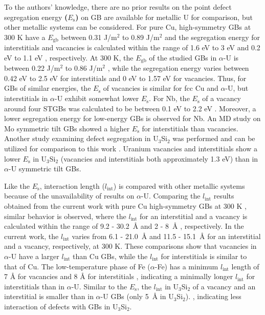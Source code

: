 \documentclass[review]{elsarticle}
\providecommand{\DIFaddtex}[1]{{\bf #1}} %
\providecommand{\DIFaddbegin}{\protect\color{blue}} %
\providecommand{\DIFaddend}{\protect\color{black}} %
\providecommand{\DIFadd}[1]{\texorpdfstring{\DIFaddtex{#1}}{#1}} %
\newcommand{\DIFaddincludegraphics}[2][]{{\color{blue}\fbox{\DIFOincludegraphics[#1]{#2}}}} %
\DeclareRobustCommand{\DIFaddbegin}{\DIFOaddbegin \let\includegraphics\DIFaddincludegraphics} %
\DeclareRobustCommand{\DIFaddend}{\DIFOaddend \let\includegraphics\DIFOincludegraphics} %
\begin{document}
\DIFaddend To the authors' knowledge, there are no prior results on the point defect segregation energy \DIFaddbegin \DIFadd{($E_{\mathrm{s}}$) }\DIFaddend on GB are available for metallic U for comparison, but other metallic systems can be considered. For pure Cu, high-symmetry GBs at 300 K \cite{bai_cu_inter, bai_cu_gb_with_interstitial_inter} have a  $E_{\mathrm{gb}}$  between 0.31 J/m${^2}$ to 0.89 J/m${^2}$ and the segregation energy for interstitials and vacancies is calculated within the range of 1.6 eV to 3 eV and 0.2 eV to 1.1 eV \cite{bai_cu_inter}, respectively. At 300 K, the  $E_{\mathrm{gb}}$  of the studied GBs in $\alpha$-U is between 0.22 J/m${^2}$ to 0.86 J/m${^2}$ \cite{MAHBUBA2021153072}, while the segregation energy varies between 0.42 eV to 2.5 eV for interstitials and 0 eV to 1.57 eV for vacancies. Thus, for GBs of similar energies, the $E_{\mathrm{s}}$ of vacancies is similar for fcc Cu and $\alpha$-U, but interstitials in $\alpha$-U exhibit somewhat lower $E_{\mathrm{s}}$. For Nb, the $E_{\mathrm{s}}$ of a vacancy around four STGBs was calculated to be between 0.1 eV to 2.2 eV \cite{Popov2022}. Moreover, a lower segregation energy for low-energy GBs is observed for Nb. An MD study on Mo symmetric tilt GBs showed a higher $E_{\mathrm{s}}$ for interstitials than vacancies\cite{Novoselov2014}. Another study examining defect segregation in U$_3$Si$_2$ was performed and can be utilized for comparison to this work \cite{beelerUSi}. Uranium vacancies and interstitials show a lower $E_{\mathrm{s}}$ in U$_\mathrm{3}$Si$_\mathrm{2}$ (vacancies and interstitials both approximately 1.3 eV) than in $\alpha$-U symmetric tilt GBs. 

Like the $E_{\mathrm{s}}$, interaction length ($l_{\mathrm{int}}$) is compared with other metallic systems because of the unavailability of results on $\alpha$-U. Comparing the $l_{\mathrm{int}}$ results obtained from the current work with pure Cu high-symmetry GBs at 300 K \cite{bai_cu_inter, bai_cu_gb_with_interstitial_inter}, similar behavior is observed, where the  $l_{\mathrm{int}}$ for an interstitial and a vacancy is calculated within the range of 9.2 - 30.2~{\AA} and 2 - 8~{\AA} \cite{bai_cu_inter}, respectively. In the current work, the  $l_{\mathrm{int}}$ varies from 6.1 - 21.0~{\AA} and 11.5 - 15.1~{\AA} for an interstitial and a vacancy, respectively, at 300 K. These comparisons show that vacancies in $\alpha$-U have a larger  $l_{\mathrm{int}}$ than Cu GBs, while the  $l_{\mathrm{int}}$ for interstitials is similar to that of Cu. The low-temperature phase of Fe ($\alpha$-Fe) has a minimum  $l_{\mathrm{int}}$ length of 7 {\AA} for vacancies and 8 {\AA} for interstitials \cite{tschopp2012probing}, indicating a minimally longer $l_{\mathrm{int}}$ for interstitials than in $\alpha$-U. Similar to the $E_{\mathrm{s}}$, the $l_{\mathrm{int}}$ in U$_\mathrm{3}$Si$_\mathrm{2}$ of a vacancy and an interstitial is smaller than in $\alpha$-U GBs (only 5~{\AA} in U$_3$Si$_2$). \cite{beeler2019}, indicating less interaction of defects with GBs in U$_3$Si$_2$. 
\end{document}
